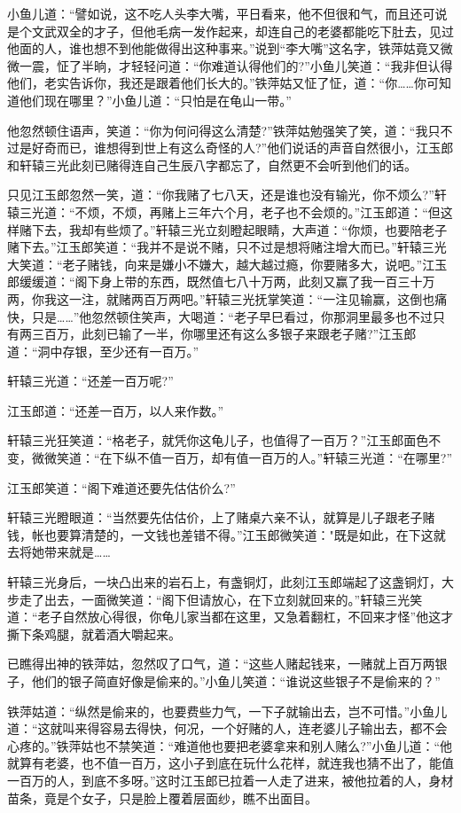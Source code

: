 \documentclass[12pt,oneside]{book}
\begin{document}
小鱼儿道：``譬如说，这不吃人头李大嘴，平日看来，他不但很和气，而且还可说是个文武双全的才子，但他毛病一发作起来，却连自己的老婆都能吃下肚去，见过他面的人，谁也想不到他能做得出这种事来。''说到``李大嘴''这名字，铁萍姑竟又微微一震，怔了半晌，才轻轻问道：``你难道认得他们的?''小鱼儿笑道：``我非但认得他们，老实告诉你，我还是跟着他们长大的。''铁萍姑又怔了怔，道：``你\ldots\ldots 你可知道他们现在哪里？''小鱼儿道：``只怕是在龟山一带。''

他忽然顿住语声，笑道：``你为何问得这么清楚?''铁萍姑勉强笑了笑，道：``我只不过是好奇而已，谁想得到世上有这么奇怪的人?''他们说话的声音自然很小，江玉郎和轩辕三光此刻已赌得连自己生辰八字都忘了，自然更不会听到他们的话。

只见江玉郎忽然一笑，道：``你我赌了七八天，还是谁也没有输光，你不烦么?''轩辕三光道：``不烦，不烦，再赌上三年六个月，老子也不会烦的。''江玉郎道：``但这样赌下去，我却有些烦了。''轩辕三光立刻瞪起眼睛，大声道：``你烦，也要陪老子赌下去。''江玉郎笑道：``我并不是说不赌，只不过是想将赌注增大而已。''轩辕三光大笑道：``老子赌钱，向来是嫌小不嫌大，越大越过瘾，你要赌多大，说吧。''江玉郎缓缓道：``阁下身上带的东西，既然值七八十万两，此刻又赢了我一百三十万两，你我这一注，就赌两百万两吧。''轩辕三光抚掌笑道：``一注见输赢，这倒也痛快，只是\ldots\ldots{}''他忽然顿住笑声，大喝道：``老子早巳看过，你那洞里最多也不过只有两三百万，此刻已输了一半，你哪里还有这么多银子来跟老子赌?''江玉郎道：``洞中存银，至少还有一百万。''

轩辕三光道：``还差一百万呢?''

江玉郎道：``还差一百万，以人来作数。''

轩辕三光狂笑道：``格老子，就凭你这龟儿子，也值得了一百万？''江玉郎面色不变，微微笑道：``在下纵不值一百万，却有值一百万的人。''轩辕三光道：``在哪里?''

江玉郎笑道：``阁下难道还要先估估价么?''

轩辕三光瞪眼道：``当然要先估估价，上了赌桌六亲不认，就算是儿子跟老子赌钱，帐也要算清楚的，一文钱也差错不得。''江玉郎微笑道："既是如此，在下这就去将她带来就是\ldots\ldots{}

轩辕三光身后，一块凸出来的岩石上，有盏铜灯，此刻江玉郎端起了这盏铜灯，大步走了出去，一面微笑道：``阁下但请放心，在下立刻就回来的。''轩辕三光笑道：``老子自然放心得很，你龟儿家当都在这里，又急着翻杠，不回来才怪''他这才撕下条鸡腿，就着酒大嚼起来。

已瞧得出神的铁萍姑，忽然叹了口气，道：``这些人赌起钱来，一赌就上百万两银子，他们的银子简直好像是偷来的。''小鱼儿笑道：``谁说这些银子不是偷来的？''

铁萍姑道：``纵然是偷来的，也要费些力气，一下子就输出去，岂不可惜。''小鱼儿道：``这就叫来得容易去得快，何况，一个好赌的人，连老婆儿子输出去，都不会心疼的。''铁萍姑也不禁笑道：``难道他也要把老婆拿来和别人赌么?''小鱼儿道：``他就算有老婆，也不值一百万，这小子到底在玩什么花样，就连我也猜不出了，能值一百万的人，到底不多呀。''这时江玉郎已拉着一人走了进来，被他拉着的人，身材苗条，竟是个女子，只是脸上覆着层面纱，瞧不出面目。
\end{document}
